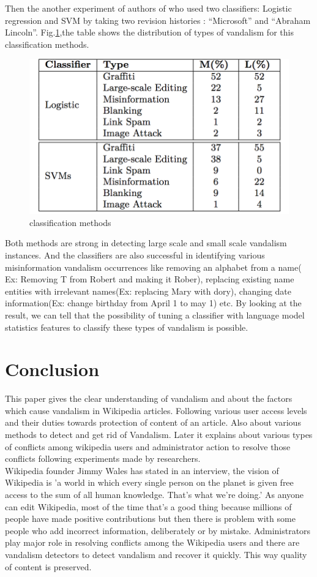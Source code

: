 \documentclass[12pt]{article}
\begin{document}
Then the another experiment of authors of \cite{active} who used two classifiers: Logistic regression and SVM  by taking two revision histories : “Microsoft” and “Abraham Lincoln”. Fig.\ref{classifier},the table shows the distribution of types of vandalism for this classification methods.
\begin{figure}[h]
\centering
\includegraphics[scale=0.5]{classifier.png}
\caption{classification methods\cite{active}}
\label{classifier}
\end{figure}
Both methods are strong in detecting large scale and small scale vandalism instances. And the classifiers are also successful in identifying various misinformation vandalism occurrences like removing an alphabet from a name( Ex: Removing T from Robert and making it Rober), replacing existing name entities with irrelevant names(Ex: replacing Mary with dory), changing date information(Ex: change birthday from April 1 to may 1) etc. By looking at the result, we can tell that the possibility of tuning a classifier with language model statistics features to classify these types of vandalism is possible.
\section{Conclusion}
This paper gives the clear understanding of vandalism and about the factors which cause vandalism in Wikipedia articles. Following various user access levels and their duties towards protection of content of an article. Also about various methods to detect and get rid of Vandalism. Later it explains about various types of conflicts among wikipedia users and administrator action to resolve those conflicts following experiments made by researchers.\\  
Wikipedia founder Jimmy Wales has stated in an interview, the vision of Wikipedia is 'a world in which every single person on the planet is given free access to the sum of all human knowledge. That’s what we’re doing.'  As anyone can edit Wikipedia, most of the time that's a good thing because millions of people have made positive contributions but then there is problem with some people who add incorrect information, deliberately or by mistake.  Administrators play major role in resolving conflicts among the Wikipedia users and there are vandalism detectors to detect vandalism and recover it quickly. This way quality of content is preserved. 
\end{document}
